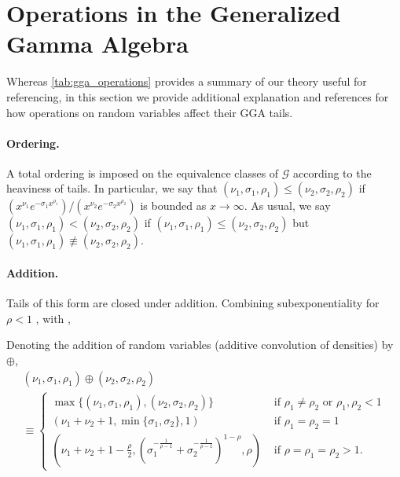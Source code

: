 \documentclass[thesis.tex]{subfiles}
\begin{document}
\section{Operations in the Generalized Gamma Algebra}

Whereas \cref{tab:gga_operations} provides a summary of our theory useful
for referencing, in this section we provide additional explanation and references
for how operations on random variables affect their GGA tails.

\paragraph{Ordering.} A total ordering is imposed on the equivalence classes of $\mathcal{G}$ according to the heaviness of tails. In particular, we say that $(\nu_1,\sigma_1,\rho_1) \leq (\nu_2,\sigma_2,\rho_2)$ if $(x^{\nu_1} e^{-\sigma_1 x^{\rho_1}}) / (x^{\nu_2} e^{-\sigma_2 x^{\rho_2}})$ is bounded as $x \to \infty$. As usual, we say $(\nu_1,\sigma_1,\rho_1) < (\nu_2,\sigma_2,\rho_2)$ if $(\nu_1,\sigma_1,\rho_1) \leq (\nu_2,\sigma_2,\rho_2)$ but $(\nu_1,\sigma_1,\rho_1) \not\equiv (\nu_2,\sigma_2,\rho_2)$. 


\paragraph{Addition.} Tails of this form are  closed under addition. Combining subexponentiality for $\rho < 1$
\cite[Chapter X.1]{asmussen2010ruin}, 
with \cite[Thm 3.1 \& eqn. (8.3)]{asmussen2017tail},
\begin{proposition}
\label{prop:gga_add}
Denoting the addition of random variables (additive convolution of densities) by $\oplus$,
\begin{multline}
(\nu_{1},\sigma_{1},\rho_{1})\oplus(\nu_{2},\sigma_{2},\rho_{2})
\\\equiv \begin{cases}
\max\{(\nu_{1},\sigma_{1},\rho_{1}),(\nu_{2},\sigma_{2},\rho_{2})\} & \text{ if }\rho_{1}\neq\rho_{2}\text{ or }\rho_{1},\rho_{2}<1\\
\left(\nu_{1}+\nu_{2}+1,\min\{\sigma_{1},\sigma_{2}\},1\right) & \text{ if }\rho_{1}=\rho_{2}=1\\
(\nu_{1}+\nu_{2}+1-\frac{\rho}{2},(\sigma_{1}^{-\frac{1}{\rho-1}}+\sigma_{2}^{-\frac{1}{\rho-1}})^{1-\rho},\rho) & \text{ if }\rho=\rho_{1}=\rho_{2}>1.
\end{cases}
\end{multline}
\end{proposition}
\end{document}
